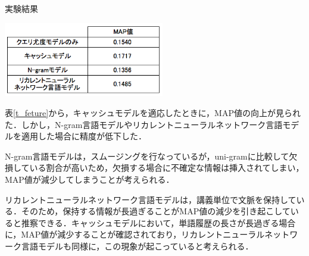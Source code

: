 \begin{table}[h]
    \centering
    \caption{実験結果}
    \includegraphics[width=7cm]{./image/t_feature2.png}
    \label{t_feture_res}
\end{table}

表\ref{t_feture}から，キャッシュモデルを適応したときに，MAP値の向上が見られた．しかし，N-gram言語モデルやリカレントニューラルネットワーク言語モデルを適用した場合に精度が低下した． 

N-gram言語モデルは，スムージングを行なっているが，uni-gramに比較して欠損している割合が高いため，欠損する場合に不確定な情報は挿入されてしまい，MAP値が減少してしまうことが考えられる．

リカレントニューラルネットワーク言語モデルは，講義単位で文脈を保持している．そのため，保持する情報が長過ぎることがMAP値の減少を引き起こしていると推察できる．キャッシュモデルにおいて，単語履歴の長さが長過ぎる場合に，MAP値が減少することが確認されており，リカレントニューラルネットワーク言語モデルも同様に，この現象が起こっていると考えられる．